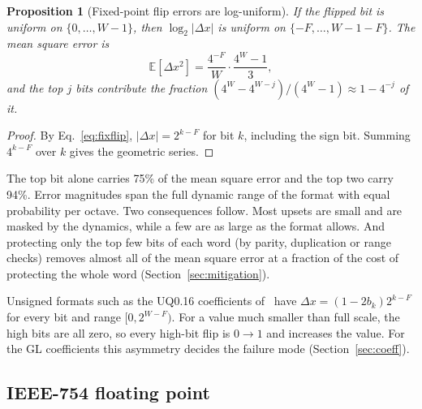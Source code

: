 \documentclass[11pt,a4paper]{article}
\newcommand{\E}{\mathbb{E}}
\newtheorem{proposition}{Proposition}
\begin{document}
\begin{proposition}[Fixed-point flip errors are log-uniform]
\label{prop:loguniform}
If the flipped bit is uniform on $\{0,\dots,W-1\}$, then $\log_2|\Delta x|$ is uniform on $\{-F, \dots, W-1-F\}$. The mean square error is
\begin{equation}
\E[\Delta x^2] = \frac{4^{-F}}{W} \cdot \frac{4^{W}-1}{3},
\end{equation}
and the top $j$ bits contribute the fraction $(4^{W} - 4^{W-j})/(4^{W}-1) \approx 1 - 4^{-j}$ of it.
\end{proposition}
\begin{proof}
By Eq.~\eqref{eq:fixflip}, $|\Delta x| = 2^{k-F}$ for bit $k$, including the sign bit. Summing $4^{k-F}$ over $k$ gives the geometric series.
\end{proof}
The top bit alone carries 75\% of the mean square error and the top two carry 94\%. Error magnitudes span the full dynamic range of the format with equal probability per octave. Two consequences follow. Most upsets are small and are masked by the dynamics, while a few are as large as the format allows. And protecting only the top few bits of each word (by parity, duplication or range checks) removes almost all of the mean square error at a fraction of the cost of protecting the whole word (Section~\ref{sec:mitigation}).

Unsigned formats such as the UQ0.16 coefficients of~\cite{mastin2026} have $\Delta x = (1-2b_k)2^{k-F}$ for every bit and range $[0, 2^{W-F})$. For a value much smaller than full scale, the high bits are all zero, so every high-bit flip is $0 \to 1$ and increases the value. For the GL coefficients this asymmetry decides the failure mode (Section~\ref{sec:coeff}).

\subsection{IEEE-754 floating point}
\end{document}
